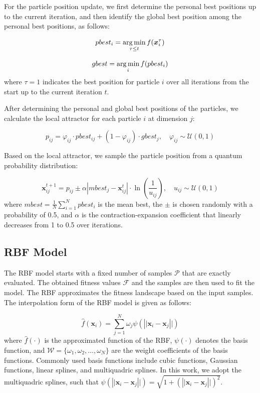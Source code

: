 \documentclass[review]{elsarticle}
\begin{document}
For the particle position update, we first determine the personal best positions up to the current iteration, and then identify the global best position among the personal best positions, as follows:

\begin{equation}
    pbest_i = \mathop{\rm arg\,min}_{\tau \leq t} f(\boldsymbol{x}_i^\tau)
\end{equation}

\begin{equation}
    gbest = \mathop{\rm arg\,min}_i f(pbest_i)
\end{equation}
where $\tau = 1$ indicates the best position for particle $i$ over all iterations from the start up to the current iteration $t$.

After determining the personal and global best positions of the particles, we calculate the local attractor for each particle $i$ at dimension $j$:

\begin{equation}
    p_{ij} = \varphi_{ij} \cdot pbest_{ij} + (1-\varphi_{ij}) \cdot gbest_j, \quad \varphi_{ij} \sim \mathcal{U}(0,1)
\end{equation}

Based on the local attractor, we sample the particle position from a quantum probability distribution:

\begin{equation}
    \boldsymbol{x}_{ij}^{t+1} = p_{ij} \pm \alpha \left| mbest_j - \boldsymbol{x}_{ij}^t \right| \cdot \ln \left(\frac{1}{u_{ij}} \right), \quad u_{ij} \sim \mathcal{U}(0,1)
\end{equation}
where $mbest = \frac{1}{N} \sum\limits_{i=1}^N pbest_i$ is the mean best, the $\pm$ is chosen randomly with a probability of 0.5, and $\alpha$ is the contraction-expansion coefficient that linearly decreases from 1 to 0.5 over iterations.

\subsection{RBF Model}

The RBF model starts with a fixed number of samples $\mathcal{P}$ that are exactly evaluated. The obtained fitness values $\mathcal{F}$ and the samples are then used to fit the model. The RBF approximates the fitness landscape based on the input samples. The interpolation form of the RBF model is given as follows:

\begin{equation}
    \hat{f} (\boldsymbol{x}_i) = \sum\limits_{j=1}^N \omega_j \psi(\left|| \boldsymbol{x}_i - \boldsymbol{x}_j \right||)
\end{equation}
where $\hat{f}(\cdot)$ is the approximated function of the RBF, $\psi(\cdot)$ denotes the basis function, and $\mathcal{W} = \{\omega_1, \omega_2, \dots, \omega_N\}$ are the weight coefficients of the basis functions. Commonly used basis functions include cubic functions, Gaussian functions, linear splines, and multiquadric splines. In this work, we adopt the multiquadric splines, such that $\psi(\left|| \boldsymbol{x}_i - \boldsymbol{x}_j \right||) = \sqrt{1 + (\left|| \boldsymbol{x}_i - \boldsymbol{x}_j \right||)^2}$.
\end{document}
